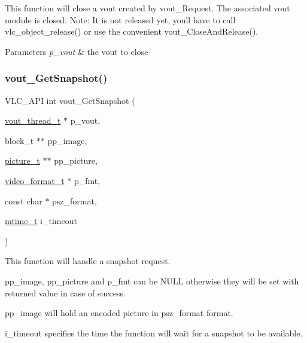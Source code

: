 This function will close a vout created by vout\+\_\+\+Request. The associated vout module is closed. Note\+: It is not released yet, you\textquotesingle{}ll have to call vlc\+\_\+object\+\_\+release() or use the convenient vout\+\_\+\+Close\+And\+Release().


\begin{DoxyParams}{Parameters}
{\em p\+\_\+vout} & the vout to close \\
\hline
\end{DoxyParams}
\mbox{\label{group__video__output_gaf9bf2ff7f4467dd658cb0469b5c0b5ed}} 
\subsubsection{\texorpdfstring{vout\+\_\+\+Get\+Snapshot()}{vout\_GetSnapshot()}}
{\footnotesize\ttfamily V\+L\+C\+\_\+\+A\+PI int vout\+\_\+\+Get\+Snapshot (\begin{DoxyParamCaption}\item[{\hyperlink{structvout__thread__t}{vout\+\_\+thread\+\_\+t} $\ast$}]{p\+\_\+vout,  }\item[{block\+\_\+t $\ast$$\ast$}]{pp\+\_\+image,  }\item[{\hyperlink{structpicture__t}{picture\+\_\+t} $\ast$$\ast$}]{pp\+\_\+picture,  }\item[{\hyperlink{structvideo__format__t}{video\+\_\+format\+\_\+t} $\ast$}]{p\+\_\+fmt,  }\item[{const char $\ast$}]{psz\+\_\+format,  }\item[{\hyperlink{vlc__common_8h_a996e47c5ea061215703c26738351279e}{mtime\+\_\+t}}]{i\+\_\+timeout }\end{DoxyParamCaption})}

This function will handle a snapshot request.

pp\+\_\+image, pp\+\_\+picture and p\+\_\+fmt can be N\+U\+LL otherwise they will be set with returned value in case of success.

pp\+\_\+image will hold an encoded picture in psz\+\_\+format format.

i\+\_\+timeout specifies the time the function will wait for a snapshot to be available. \mbox{\label{group__video__output_ga4c225701bb02847e303ab12bd7740394}} 

